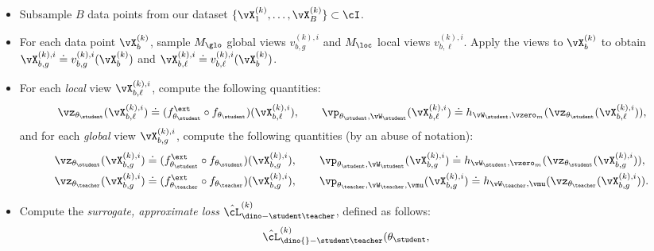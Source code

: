 \documentclass[../../book-main.tex]{subfiles}
\begin{document}
\begin{itemize}
    \item Subsample \(B\) data points from our dataset
        \(\{\vX_{1}^{(k)}, \dots, \vX_{B}^{(k)}\} \subset \cI\).
    \item For each data point \(\vX_{b}^{(k)}\), sample \(M_{\glo}\)
        global views \(v_{b, g}^{(k), i}\) and \(M_{\loc}\) local
        views \(v_{b, \ell}^{(k), i}\).
        Apply the views to
        \(\vX_{b}^{(k)}\) to obtain \(\vX_{b, g}^{(k), i} \doteq
        v_{b, g}^{(k), i}(\vX_{b}^{(k)})\) and \(\vX_{b, \ell}^{(k),
        i} \doteq v_{b, \ell}^{(k), i}(\vX_{b}^{(k)})\).
    \item For each \textit{local} view \(\vX_{b, \ell}^{(k), i}\),
        compute the following quantities:
        \begin{equation}
            \vz_{\theta_{\student}}(\vX_{b, \ell}^{(k), i}) \doteq
            (f_{\theta_{\student}}^{\ext} \circ
            f_{\theta_{\student}})(\vX_{b, \ell}^{(k), i}), \qquad
            \vp_{\theta_{\student}, \vW_{\student}}(\vX_{b,
            \ell}^{(k), i}) \doteq h_{\vW_{\student},
            \vzero_{m}}(\vz_{\theta_{\student}}(\vX_{b, \ell}^{(k), i})) ,
        \end{equation}
        and for each \textit{global} view \(\vX_{b, g}^{(k), i}\),
        compute the following quantities (by an abuse of notation):
        \begin{align}
            \vz_{\theta_{\student}}(\vX_{b, g}^{(k), i}) &\doteq
            (f_{\theta_{\student}}^{\ext} \circ
            f_{\theta_{\student}})(\vX_{b, g}^{(k), i}), \qquad
            \vp_{\theta_{\student}, \vW_{\student}}(\vX_{b, g}^{(k),
            i}) \doteq h_{\vW_{\student},
            \vzero_{m}}(\vz_{\theta_{\student}}(\vX_{b, g}^{(k), i})) , \\
            \vz_{\theta_{\teacher}}(\vX_{b, g}^{(k), i}) &\doteq
            (f_{\theta_{\teacher}}^{\ext} \circ
            f_{\theta_{\teacher}})(\vX_{b, g}^{(k), i}), \qquad
            \vp_{\theta_{\teacher}, \vW_{\teacher}, \vmu}(\vX_{b,
            g}^{(k), i}) \doteq h_{\vW_{\teacher},
            \vmu}(\vz_{\theta_{\teacher}}(\vX_{b, g}^{(k), i})) .
        \end{align}
    \item Compute the \textit{surrogate, approximate loss}
        \(\hat{\cL}_{\dino-\student\teacher}^{(k)}\), defined as follows:
        \begin{align}\label{eq:dino_loss_teacherstudent_empirical}
            &\hat{\cL}_{\dino{}-\student\teacher}^{(k)}(\theta_{\student},

\end{align}
\end{itemize}
\end{document}
